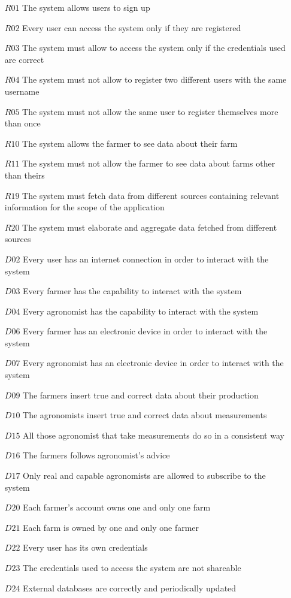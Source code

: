 \documentclass[10pt]{report}
\begin{document}
\begin{itemize}
    \item [$R01$] The system allows users to sign up
    \item [$R02$] Every user can access the system only if they are registered
    \item [$R03$] The system must allow to access the system only if the credentials used are correct
    \item [$R04$] The system must not allow to register two different users with the same username
    \item [$R05$] The system must not allow the same user to register themselves more than once
    \item [$R10$] The system allows the farmer to see data about their farm
    \item [$R11$] The system must not allow the farmer to see data about farms other than theirs
    \item [$R19$] The system must fetch data from different sources containing relevant information for the scope of the application
    \item [$R20$] The system must elaborate and aggregate data fetched from different sources
    \item [$D02$] Every user has an internet connection in order to interact with the system
    \item [$D03$] Every farmer has the capability to interact with the system
    \item [$D04$] Every agronomist has the capability to interact with the system
    \item [$D06$] Every farmer has an electronic device in order to interact with the system
    \item [$D07$] Every agronomist has an electronic device in order to interact with the system
    \item [$D09$] The farmers insert true and correct data about their production
    \item [$D10$] The agronomists insert true and correct data about measurements
    \item [$D15$] All those agronomist that take measurements do so in a consistent way
    \item [$D16$] The farmers follows agronomist’s advice
    \item [$D17$] Only real and capable agronomists are allowed to subscribe to the system
    \item [$D20$] Each farmer’s account owns one and only one farm
    \item [$D21$] Each farm is owned by one and only one farmer
    \item [$D22$] Every user has its own credentials
    \item [$D23$] The credentials used to access the system are not shareable
    \item [$D24$] External databases are correctly and periodically updated
\end{itemize}
\end{document}
